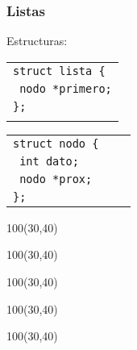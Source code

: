 \documentclass[aspectratio=169]{beamer}
\begin{document}
\begin{frame}[t]
    \frametitle{Listas}
    Estructuras:
    \begin{multicols}{2}
    \begin{tabular}{l}
    \texttt{struct lista \{}      \\
    \texttt{      nodo *primero;} \\
    \texttt{\};}                  \\
    \hspace{4cm}
    \end{tabular}
    \columnbreak
    \begin{tabular}{lll}
    \texttt{struct nodo \{}     \\
    \texttt{      int dato;}    \\
    \texttt{      nodo *prox;}  \\
    \texttt{\};}                \\
    \end{tabular}
    \end{multicols}
    \begin{textblock}{100}(30,40)  \end{textblock}
    \begin{textblock}{100}(30,40)  \end{textblock}
    \begin{textblock}{100}(30,40)  \end{textblock}
    \begin{textblock}{100}(30,40)  \end{textblock}
    \begin{textblock}{100}(30,40)  \end{textblock}
\end{frame}
\end{document}
